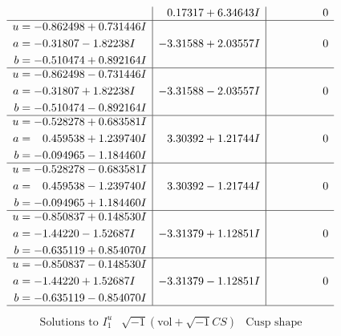 \documentclass[1p]{elsarticle_modified}
\theoremstyle{definition}
\newcommand{\I}{\sqrt{-1}}
\begin{document}
$$\begin{array}{c|c|c}
 & \phantom{-}0.17317 + 6.34643 I & \phantom{-0.000000 } 0 \\ \hline\begin{aligned}
u &= -0.862498 + 0.731446 I \\
a &= -0.31807 - 1.82238 I \\
b &= -0.510474 + 0.892164 I\end{aligned}
 & -3.31588 + 2.03557 I & \phantom{-0.000000 } 0 \\ \hline\begin{aligned}
u &= -0.862498 - 0.731446 I \\
a &= -0.31807 + 1.82238 I \\
b &= -0.510474 - 0.892164 I\end{aligned}
 & -3.31588 - 2.03557 I & \phantom{-0.000000 } 0 \\ \hline\begin{aligned}
u &= -0.528278 + 0.683581 I \\
a &= \phantom{-}0.459538 + 1.239740 I \\
b &= -0.094965 - 1.184460 I\end{aligned}
 & \phantom{-}3.30392 + 1.21744 I & \phantom{-0.000000 } 0 \\ \hline\begin{aligned}
u &= -0.528278 - 0.683581 I \\
a &= \phantom{-}0.459538 - 1.239740 I \\
b &= -0.094965 + 1.184460 I\end{aligned}
 & \phantom{-}3.30392 - 1.21744 I & \phantom{-0.000000 } 0 \\ \hline\begin{aligned}
u &= -0.850837 + 0.148530 I \\
a &= -1.44220 - 1.52687 I \\
b &= -0.635119 + 0.854070 I\end{aligned}
 & -3.31379 + 1.12851 I & \phantom{-0.000000 } 0 \\ \hline\begin{aligned}
u &= -0.850837 - 0.148530 I \\
a &= -1.44220 + 1.52687 I \\
b &= -0.635119 - 0.854070 I\end{aligned}
 & -3.31379 - 1.12851 I & \phantom{-0.000000 } 0\\
 \hline 
 \end{array}$$\newpage$$\begin{array}{c|c|c}  
\text{Solutions to }I^u_{1}& \I (\text{vol} + \sqrt{-1}CS) & \text{Cusp shape}\\

\end{array}$$
\end{document}
